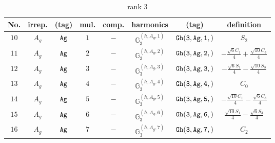 \documentclass[fleqn,8pt]{jsarticle}
\begin{document}
\begin{table}[ht!]
\begin{center}
\caption{rank 3}
\renewcommand{\arraystretch}{1.3}
\begin{tabular}{cccccccc} \hline \hline
No. & irrep. & (tag) & mul. & comp. & harmonics & (tag) & definition \\ \hline
$ 10 $ & $ A_{g} $ & $ {\tt Ag} $ & $ 1 $ & $ - $ & $ \mathbb{G}_{3}^{(h,A_{g},1)} $ & $ {\tt Gh(3,Ag,1,)} $ & $ S_{2} $ \\
$ 11 $ & $ A_{g} $ & $ {\tt Ag} $ & $ 2 $ & $ - $ & $ \mathbb{G}_{3}^{(h,A_{g},2)} $ & $ {\tt Gh(3,Ag,2,)} $ & $ - \frac{\sqrt{6} C_{1}}{4} + \frac{\sqrt{10} C_{3}}{4} $ \\
$ 12 $ & $ A_{g} $ & $ {\tt Ag} $ & $ 3 $ & $ - $ & $ \mathbb{G}_{3}^{(h,A_{g},3)} $ & $ {\tt Gh(3,Ag,3,)} $ & $ - \frac{\sqrt{6} S_{1}}{4} - \frac{\sqrt{10} S_{3}}{4} $ \\
$ 13 $ & $ A_{g} $ & $ {\tt Ag} $ & $ 4 $ & $ - $ & $ \mathbb{G}_{3}^{(h,A_{g},4)} $ & $ {\tt Gh(3,Ag,4,)} $ & $ C_{0} $ \\
$ 14 $ & $ A_{g} $ & $ {\tt Ag} $ & $ 5 $ & $ - $ & $ \mathbb{G}_{3}^{(h,A_{g},5)} $ & $ {\tt Gh(3,Ag,5,)} $ & $ - \frac{\sqrt{10} C_{1}}{4} - \frac{\sqrt{6} C_{3}}{4} $ \\
$ 15 $ & $ A_{g} $ & $ {\tt Ag} $ & $ 6 $ & $ - $ & $ \mathbb{G}_{3}^{(h,A_{g},6)} $ & $ {\tt Gh(3,Ag,6,)} $ & $ \frac{\sqrt{10} S_{1}}{4} - \frac{\sqrt{6} S_{3}}{4} $ \\
$ 16 $ & $ A_{g} $ & $ {\tt Ag} $ & $ 7 $ & $ - $ & $ \mathbb{G}_{3}^{(h,A_{g},7)} $ & $ {\tt Gh(3,Ag,7,)} $ & $ C_{2} $ \\
 \hline \hline
\end{tabular}
\end{center}
\end{table}
\end{document}
